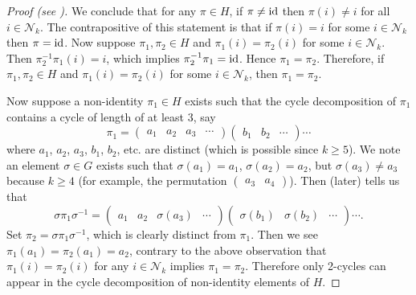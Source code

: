 \begin{proof}[Proof (see {\cite[Theorem 4.24]{dummit_foote_2004}})]
    We conclude that for any $\pi \in H$, if $\pi \neq \mathrm{id}$ then $\pi(i) \neq i$ for all $i \in \mathcal{N}_k$. The contrapositive of this statement is that if $\pi(i) = i$ for some $i \in \mathcal{N}_k$ then $\pi = \mathrm{id}$. Now suppose $\pi_1, \pi_2 \in H$ and $\pi_1(i) = \pi_2(i)$ for some $i \in \mathcal{N}_{k}$. Then $\pi_2^{-1}\pi_1(i) = i$, which implies $\pi_2^{-1}\pi_1 = \mathrm{id}$. Hence $\pi_1 = \pi_2$. Therefore, if $\pi_1, \pi_2 \in H$ and $\pi_1(i) = \pi_2(i)$ for some $i \in \mathcal{N}_{k}$, then $\pi_1 = \pi_2$.

    Now suppose a non-identity $\pi_1 \in H$ exists such that the cycle decomposition of $\pi_1$ contains a cycle of length of at least 3, say
    \[
        \pi_1 = \begin{pmatrix}a_1&a_2&a_3&\cdots\end{pmatrix} \begin{pmatrix}b_1&b_2&\cdots\end{pmatrix}\cdots
    \]
    where $a_1$, $a_2$, $a_3$, $b_1$, $b_2$, etc. are distinct (which is possible since $k \geq 5$). We note an element $\sigma \in G$ exists such that $\sigma(a_1) = a_1$, $\sigma(a_2) = a_2$, but $\sigma(a_3) \neq a_3$ because $k \geq 4$ (for example, the permutation $\begin{pmatrix}a_3 & a_4\end{pmatrix}$). Then  (later) tells us that
    \[
        \sigma\pi_1\sigma^{-1} = \begin{pmatrix}a_1&a_2&\sigma(a_3)&\cdots\end{pmatrix} \begin{pmatrix}\sigma(b_1)&\sigma(b_2)&\cdots\end{pmatrix}\cdots.
    \]
    Set $\pi_2 = \sigma\pi_1\sigma^{-1}$, which is clearly distinct from $\pi_1$. Then we see $\pi_1(a_1) = \pi_2(a_1) = a_2$, contrary to the above observation that $\pi_1(i) = \pi_2(i)$ for any $i \in \mathcal{N}_k$ implies $\pi_1 = \pi_2$. Therefore only 2-cycles can appear in the cycle decomposition of non-identity elements of $H$.


\end{proof}

